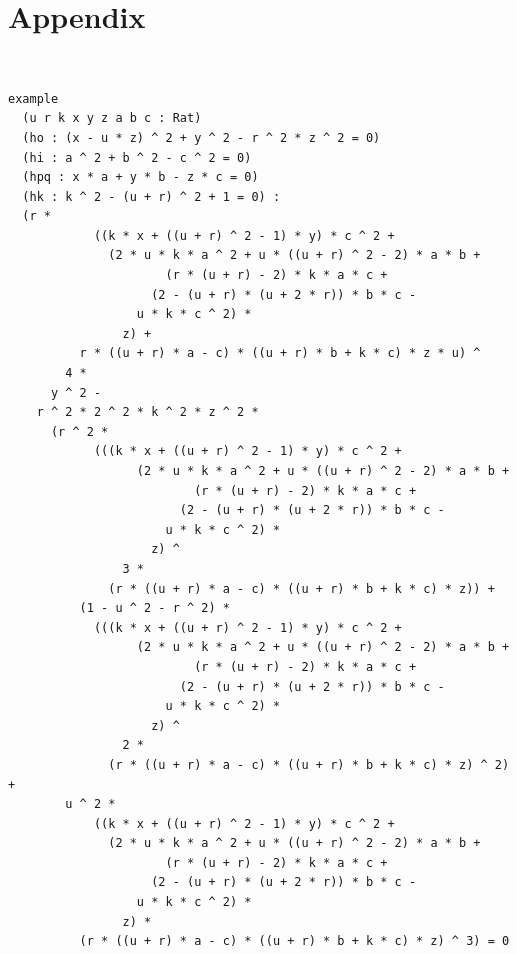 \documentclass[runningheads]{llncs}
\begin{document}
\section*{Appendix}
\begin{example}
  \label{ex:big-example}
  \, \\
  \begin{small}
\begin{verbatim}
example
  (u r k x y z a b c : Rat)
  (ho : (x - u * z) ^ 2 + y ^ 2 - r ^ 2 * z ^ 2 = 0)
  (hi : a ^ 2 + b ^ 2 - c ^ 2 = 0)
  (hpq : x * a + y * b - z * c = 0)
  (hk : k ^ 2 - (u + r) ^ 2 + 1 = 0) :
  (r *
            ((k * x + ((u + r) ^ 2 - 1) * y) * c ^ 2 +
              (2 * u * k * a ^ 2 + u * ((u + r) ^ 2 - 2) * a * b +
                      (r * (u + r) - 2) * k * a * c +
                    (2 - (u + r) * (u + 2 * r)) * b * c -
                  u * k * c ^ 2) *
                z) +
          r * ((u + r) * a - c) * ((u + r) * b + k * c) * z * u) ^
        4 *
      y ^ 2 -
    r ^ 2 * 2 ^ 2 * k ^ 2 * z ^ 2 *
      (r ^ 2 *
            (((k * x + ((u + r) ^ 2 - 1) * y) * c ^ 2 +
                  (2 * u * k * a ^ 2 + u * ((u + r) ^ 2 - 2) * a * b +
                          (r * (u + r) - 2) * k * a * c +
                        (2 - (u + r) * (u + 2 * r)) * b * c -
                      u * k * c ^ 2) *
                    z) ^
                3 *
              (r * ((u + r) * a - c) * ((u + r) * b + k * c) * z)) +
          (1 - u ^ 2 - r ^ 2) *
            (((k * x + ((u + r) ^ 2 - 1) * y) * c ^ 2 +
                  (2 * u * k * a ^ 2 + u * ((u + r) ^ 2 - 2) * a * b +
                          (r * (u + r) - 2) * k * a * c +
                        (2 - (u + r) * (u + 2 * r)) * b * c -
                      u * k * c ^ 2) *
                    z) ^
                2 *
              (r * ((u + r) * a - c) * ((u + r) * b + k * c) * z) ^ 2) +
        u ^ 2 *
            ((k * x + ((u + r) ^ 2 - 1) * y) * c ^ 2 +
              (2 * u * k * a ^ 2 + u * ((u + r) ^ 2 - 2) * a * b +
                      (r * (u + r) - 2) * k * a * c +
                    (2 - (u + r) * (u + 2 * r)) * b * c -
                  u * k * c ^ 2) *
                z) *
          (r * ((u + r) * a - c) * ((u + r) * b + k * c) * z) ^ 3) = 0
\end{verbatim}
  \end{small}
\end{example}
\end{document}
